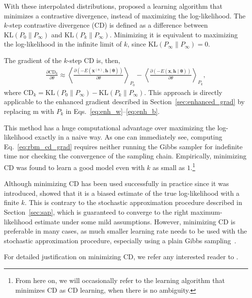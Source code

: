\documentclass{now}
\newcommand{\vect}[1]{\mathbf{#1}}
\newcommand{\vects}[1]{\boldsymbol{#1}}
\newcommand{\vh}[0]{\vect{h}}
\newcommand{\vx}[0]{\vect{x}}
\newcommand{\tf}[0]{\text{m}}
\newcommand{\TT}[0]{{\vects{\theta}}}
\newcommand{\KL}[0]{\text{KL}}
\newcommand{\CD}[0]{\text{CD}}
\begin{document}
With these interpolated distributions, \citet{Hinton2002} proposed a learning
algorithm that minimizes a contrastive divergence, instead of maximizing the
log-likelihood.  The $k$-step contrastive divergence
(CD) is defined as a difference between
$\KL(P_0 \| P_{\infty})$ and $\KL(P_k \| P_\infty)$. Minimizing it is equivalent
to maximizing the log-likelihood in the infinite limit of $k$, since
$\KL(P_\infty \| P_\infty) = 0$.

The gradient of the $k$-step CD is, then,
\begin{align}
    \label{eq:rbm_cd_grad}
    \frac{\partial \CD_k}{\partial \theta} \approx
    \left< \frac{\partial
    \left(-E(\vx^{(n)}, \vh\mid\TT)\right)}{\partial \theta}
    \right>_{P_0} 
    -
    \left< \frac{\partial
    \left(-E(\vx, \vh\mid\TT)\right)}{\partial \theta}
    \right>_{P_k},
\end{align}
where $\CD_k = \KL(P_0 \| P_{\infty}) - \KL(P_k \| P_\infty)$. This approach is
directly applicable to the enhanced gradient described in
Section~\ref{sec:enhanced_grad} by replacing $\tf$ with $P_k$ in
Eqs.~\eqref{eq:enh_w}--\eqref{eq:enh_b}.

This method has a huge computational advantage over maximizing the
log-likelihood exactly in a naive way. As one can immediately see, computing
Eq.~\eqref{eq:rbm_cd_grad} requires neither running the Gibbs sampler for
indefinite time nor checking the convergence of the sampling chain.
Empirically, minimizing CD was found to learn a good model even with $k$ as
small as $1$.\footnote{ 
    From here on, we will occasionally refer to the learning algorithm that
    minimizes CD as CD learning, when there is no ambiguity.
}

Although minimizing CD has been used successfully in practice since it was
introduced, \citet{Carreira-Perpinan2005,Bengio2009} showed that it is a biased
estimate of the true log-likelihood with a finite $k$. This is contrary to the
stochastic approximation procedure described in Section~\ref{sec:sap}, which is
guaranteed to converge to the right maximum-likelihood estimate under some mild
assumptions. However, minimizing CD is preferable in many cases, as much smaller
learning rate needs to be used with the stochastic approximation procedure,
especially using a plain Gibbs sampling~\citep[see, e.g.,][]{Hinton2012rbm}.

For detailed justification on minimizing CD, we refer any interested reader to
\citep{Bengio2009}.
\end{document}
